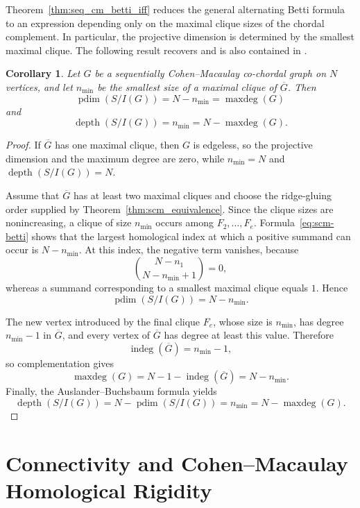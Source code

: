 \documentclass[12pt, reqno]{amsart}
\newtheorem{corollary}[theorem]{Corollary}
\theoremstyle{definition}
\numberwithin{equation}{section}
\begin{document}
	Theorem~\ref{thm:seq_cm_betti_iff} reduces the general alternating Betti formula to an expression depending only on the maximal clique sizes of the chordal complement. In particular,  the projective dimension is determined by the smallest maximal clique. The following result recovers \cite[Theorem 5.4]{ahmed2025} and is also contained in \cite[Corollary 5.11]{namiq2026_icm}.
	
	\begin{corollary}\label{cor:pdim_max_degree}
Let $G$ be a sequentially Cohen--Macaulay co-chordal graph on $N$ vertices, and let $n_{\min}$ be the smallest size of a maximal clique of $\overline G$.  Then
\[
\operatorname{pdim}(S/I(G))=N-n_{\min}=\operatorname{maxdeg}(G)
\]
and
\[
\operatorname{depth}(S/I(G))=n_{\min}=N-\operatorname{maxdeg}(G).
\]
\end{corollary}
\begin{proof}
If $\overline G$ has one maximal clique, then $G$ is edgeless, so the projective dimension and the maximum degree are zero, while $n_{\min}=N$ and $\operatorname{depth}(S/I(G))=N$.

Assume that $\overline G$ has at least two maximal cliques and choose the ridge-gluing order supplied by Theorem~\ref{thm:scm_equivalence}.  Since the clique sizes are nonincreasing, a clique of size $n_{\min}$ occurs among $F_2,\ldots,F_e$.  Formula~\eqref{eq:scm-betti} shows that the largest homological index at which a positive summand can occur is $N-n_{\min}$.  At this index, the negative term vanishes, because
\[
\binom{N-n_1}{N-n_{\min}+1}=0,
\]
whereas a summand corresponding to a smallest maximal clique equals $1$.  Hence
\[
\operatorname{pdim}(S/I(G))=N-n_{\min}.
\]

The new vertex introduced by the final clique $F_e$, whose size is $n_{\min}$, has degree $n_{\min}-1$ in $\overline G$, and every vertex of $\overline G$ has degree at least this value.  Therefore
\[
\operatorname{indeg}(\overline G)=n_{\min}-1,
\]
so complementation gives
\[
\operatorname{maxdeg}(G)
=N-1-\operatorname{indeg}(\overline G)
=N-n_{\min}.
\]
Finally, the Auslander--Buchsbaum formula yields
\[
\operatorname{depth}(S/I(G))
=N-\operatorname{pdim}(S/I(G))
=n_{\min}
=N-\operatorname{maxdeg}(G).
\]
\end{proof}

\section{Connectivity and Cohen--Macaulay Homological Rigidity} \label{sec:rigidity}
	
\end{document}
